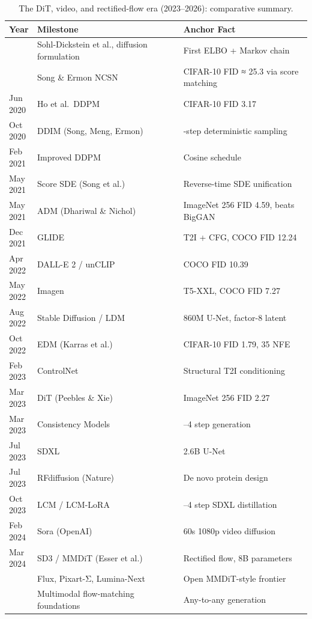 \documentclass{article}
\begin{document}
\begin{table}[t]
\centering
\caption{The DiT, video, and rectified-flow era (2023--2026): comparative summary.}
\label{tab:the-dit-video-and-rectified-flow-era-2023-2026}
\begin{tabular}{>{\raggedright\arraybackslash}p{0.0889\linewidth}
  >{\raggedright\arraybackslash}p{0.4889\linewidth}
  >{\raggedright\arraybackslash}p{0.4222\linewidth}}
\toprule
Year & Milestone & Anchor Fact \\
\midrule
2015 & Sohl-Dickstein et al., diffusion formulation & First ELBO + Markov chain \\
2019 & Song \& Ermon NCSN & CIFAR-10 FID ≈ 25.3 via score matching \\
Jun 2020 & Ho et al.~DDPM & CIFAR-10 FID 3.17 \\
Oct 2020 & DDIM (Song, Meng, Ermon) & 50-step deterministic sampling \\
Feb 2021 & Improved DDPM & Cosine schedule \\
May 2021 & Score SDE (Song et al.) & Reverse-time SDE unification \\
May 2021 & ADM (Dhariwal \& Nichol) & ImageNet 256 FID 4.59, beats BigGAN \\
Dec 2021 & GLIDE & T2I + CFG, COCO FID 12.24 \\
Apr 2022 & DALL-E 2 / unCLIP & COCO FID 10.39 \\
May 2022 & Imagen & T5-XXL, COCO FID 7.27 \\
Aug 2022 & Stable Diffusion / LDM & 860M U-Net, factor-8 latent \\
Oct 2022 & EDM (Karras et al.) & CIFAR-10 FID 1.79, 35 NFE \\
Feb 2023 & ControlNet & Structural T2I conditioning \\
Mar 2023 & DiT (Peebles \& Xie) & ImageNet 256 FID 2.27 \\
Mar 2023 & Consistency Models & 1--4 step generation \\
Jul 2023 & SDXL & 2.6B U-Net \\
Jul 2023 & RFdiffusion (Nature) & De novo protein design \\
Oct 2023 & LCM / LCM-LoRA & 2--4 step SDXL distillation \\
Feb 2024 & Sora (OpenAI) & 60s 1080p video diffusion \\
Mar 2024 & SD3 / MMDiT (Esser et al.) & Rectified flow, 8B parameters \\
2025 & Flux, Pixart-Σ, Lumina-Next & Open MMDiT-style frontier \\
2026 & Multimodal flow-matching foundations & Any-to-any generation \\
\end{tabular}
\end{table}
\end{document}
